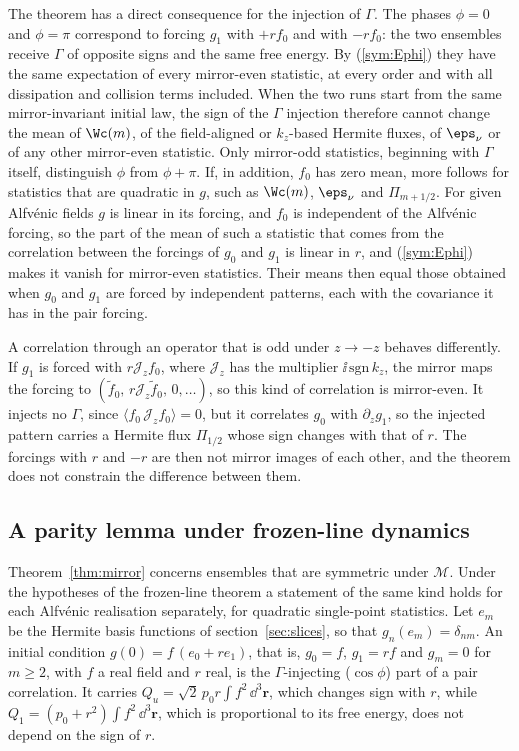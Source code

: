 The theorem has a direct consequence for the injection of $\Gamma$. The phases $\phi=0$ and $\phi=\pi$ correspond to forcing $g_1$ with $+rf_0$ and with $-rf_0$: the two ensembles receive $\Gamma$ of opposite signs and the same free energy. By (\ref{sym:Ephi}) they have the same expectation of every mirror-even statistic, at every order and with all dissipation and collision terms included. When the two runs start from the same mirror-invariant initial law, the sign of the $\Gamma$ injection therefore cannot change the mean of $\Wc(m)$, of the field-aligned or $k_z$-based Hermite fluxes, of $\eps_\nu$ or of any other mirror-even statistic. Only mirror-odd statistics, beginning with $\Gamma$ itself, distinguish $\phi$ from $\phi+\pi$. If, in addition, $f_0$ has zero mean, more follows for statistics that are quadratic in $g$, such as $\Wc(m)$, $\eps_\nu$ and $\Pi_{m+1/2}$. For given Alfv\'enic fields $g$ is linear in its forcing, and $f_0$ is independent of the Alfv\'enic forcing, so the part of the mean of such a statistic that comes from the correlation between the forcings of $g_0$ and $g_1$ is linear in $r$, and (\ref{sym:Ephi}) makes it vanish for mirror-even statistics. Their means then equal those obtained when $g_0$ and $g_1$ are forced by independent patterns, each with the covariance it has in the pair forcing.

A correlation through an operator that is odd under $z\to-z$ behaves differently. If $g_1$ is forced with $r\mathcal J_zf_0$, where $\mathcal J_z$ has the multiplier $\ii\,\mathrm{sgn}\,k_z$, the mirror maps the forcing to $(\tilde f_0,\,r\mathcal J_z\tilde f_0,\,0,\dots)$, so this kind of correlation is mirror-even. It injects no $\Gamma$, since $\langle f_0\,\mathcal J_zf_0\rangle=0$, but it correlates $g_0$ with $\partial_zg_1$, so the injected pattern carries a Hermite flux $\Pi_{1/2}$ whose sign changes with that of $r$. The forcings with $r$ and $-r$ are then not mirror images of each other, and the theorem does not constrain the difference between them.

\subsection{A parity lemma under frozen-line dynamics}\label{sym:parity}

Theorem~\ref{thm:mirror} concerns ensembles that are symmetric under $\mathcal M$. Under the hypotheses of the frozen-line theorem a statement of the same kind holds for each Alfv\'enic realisation separately, for quadratic single-point statistics. Let $e_m$ be the Hermite basis functions of section~\ref{sec:slices}, so that $g_n(e_m)=\delta_{nm}$. An initial condition $g(0)=f\,(e_0+re_1)$, that is, $g_0=f$, $g_1=rf$ and $g_m=0$ for $m\ge2$, with $f$ a real field and $r$ real, is the $\Gamma$-injecting ($\cos\phi$) part of a pair correlation. It carries $Q_u=\sqrt2\,p_0r\int f^2\,\dd^3\boldsymbol r$, which changes sign with $r$, while $Q_1=(p_0+r^2)\int f^2\,\dd^3\boldsymbol r$, which is proportional to its free energy, does not depend on the sign of $r$.

